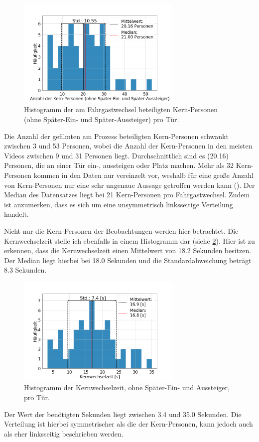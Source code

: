 \begin{figure}[H]
	\centering
		\includegraphics[width=0.7\textwidth]{pictures/data_evaluation/transferTime/hist_core_persons.png}
	\caption{Histogramm der am Fahrgastwechsel beteiligten Kern-Personen (ohne Später-Ein- und Später-Aussteiger) pro Tür.}
	\label{fig:histPersonen}
\end{figure}
Die Anzahl der gefilmten am Prozess beteiligten Kern-Personen schwankt zwischen 3 und 53 Personen, wobei die Anzahl der Kern-Personen in den meisten Videos zwischen 9 und 31 Personen liegt. Durchschnittlich sind es  (20.16) Personen, die an einer Tür ein-, aussteigen oder Platz machen. Mehr als 32 Kern-Personen kommen in den Daten nur vereinzelt vor, weshalb für eine große Anzahl von Kern-Personen nur eine sehr ungenaue Aussage getroffen werden kann (\cite{Fahrmeir.2009}). Der Median des Datensatzes liegt bei 21 Kern-Personen pro Fahrgastwechsel. Zudem ist anzumerken, dass es sich um eine unsymmetrisch linksseitige Verteilung handelt.

Nicht nur die Kern-Personen der Beobachtungen werden hier betrachtet. Die Kernwechselzeit stelle ich ebenfalls in einem Histogramm dar (siehe \figurename \ref{fig:histTimes}). Hier ist zu erkennen, dass die Kernwechselzeit einen Mittelwert von 18.2 Sekunden besitzen. Der Median liegt hierbei bei 18.0 Sekunden und die Standardabweichung beträgt 8.3 Sekunden. 
\begin{figure}[H]
	\centering
		\includegraphics[width=0.7\textwidth]{pictures/data_evaluation/transferTime/hist_core_transfer_time.png}
	\caption{Histogramm der Kernwechselzeit, ohne Später-Ein- und Aussteiger, pro Tür.}
	\label{fig:histTimes}
\end{figure}
Der Wert der benötigten Sekunden liegt zwischen 3.4 und 35.0 Sekunden. Die Verteilung ist hierbei symmetrischer als die der Kern-Personen, kann jedoch auch als eher linksseitig beschrieben werden.

